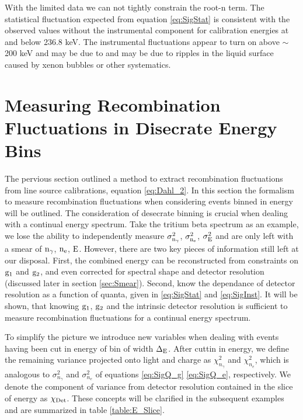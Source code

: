 \noindent With the limited data we can not tightly constrain the root-n term. The statistical fluctuation expected from equation \ref{eq:SigStat} is consistent with the observed values without the instrumental component for calibration energies at and below 236.8 keV. The instrumental fluctuations appear to turn on above $\sim$200 keV and may be due to and may be due to ripples in the liquid surface caused by xenon bubbles or other systematics. 


\section{Measuring Recombination Fluctuations in Disecrate Energy Bins}
\label{sec:flucs_mono_bins}

The pervious section outlined a method to extract recombination fluctuations from line source calibrations, equation \ref{eq:Dahl_2}. In this section the formalism to measure recombination fluctuations when considering events binned in energy will be outlined. The consideration of desecrate binning is crucial when dealing with a continual energy spectrum. Take the tritium beta spectrum as an example, we lose the ability to independently measure $\rm \sigma_{n_\gamma}^2$, $\rm \sigma_{n_e}^2$, $\rm \sigma_{E}^2 $ and are only left with a smear of $\rm n_\gamma$, $\rm n_e$, $\rm E $. However, there are two key pieces of information still left at our disposal. First, the combined energy can be reconstructed from constraints on $\rm g_1$ and $\rm g_2$, and even corrected for spectral shape and detector resolution (discussed later in section \ref{sec:Smear}). Second, know the dependance of detector resolution as a function of quanta, given in \ref{eq:SigStat} and  \ref{eq:SigInst}. It will be shown, that knowing $\rm g_1$, $\rm g_2$ and the intrinsic detector resolution is sufficient to measure recombination fluctuations for a continual energy spectrum. 

To simplify the picture we introduce new variables when dealing with events having been cut in energy of bin of width $\rm \Delta_E$.  After cuttin in energy, we define the remaining variance projected onto light and charge as $\chi_{n_{\gamma}}^2$ and $\chi_{n_{e}}^2$, which is analogous to $\sigma_{n_{\gamma}}^2$ and $\sigma_{n_{e}}^2$ of equations \ref{eq:SigQ_g} \ref{eq:SigQ_e}, respectively. We denote the component of variance from detector resolution contained in the slice of energy as $\rm \chi_{Det}$. These concepts will be clarified in the subsequent examples and are summarized in table \ref{table:E_Slice}.

